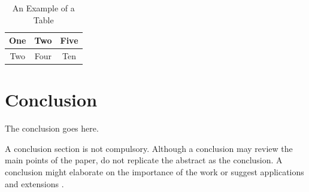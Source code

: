 \documentclass[journal]{IAENGtran}
\begin{document}
\begin{table}[!t]
\renewcommand{\arraystretch}{1.3}
\caption{An Example of a Table} \label{table_example}
\centering
\begin{tabular}{|c||c||c|}
\hline
One & Two & Five\\
\hline
Two & Four & Ten\\
\hline
\end{tabular}
\end{table}





\section{Conclusion}
The conclusion goes here.

A conclusion section is not compulsory. Although a conclusion may
review the main points of the paper, do not replicate the abstract
as the conclusion. A conclusion might elaborate on the importance of
the work or suggest applications and extensions
\cite{IAENGhowto:kopka, IJCS, EL, IJAM, WCECS, WCE, IMECS}.





%
\end{document}
